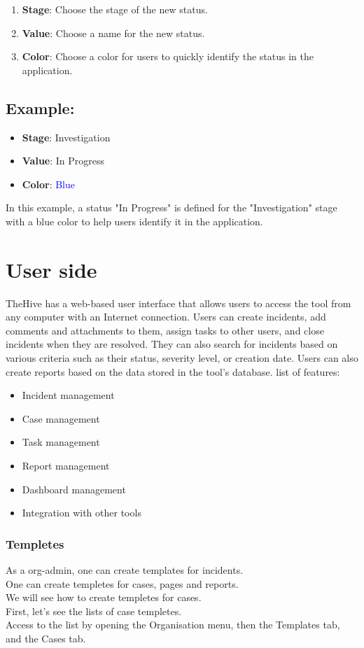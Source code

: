 \documentclass{article}
\begin{document}
\begin{enumerate}
  \item \textbf{Stage}: Choose the stage of the new status.
  \item \textbf{Value}: Choose a name for the new status.
  \item \textbf{Color}: Choose a color for users to quickly identify the status in the application.
\end{enumerate}

\subsection*{Example:}

\begin{itemize}
  \item \textbf{Stage}: Investigation
  \item \textbf{Value}: In Progress
  \item \textbf{Color}: \textcolor{blue}{Blue}
\end{itemize}

In this example, a status "In Progress" is defined for the "Investigation" stage with a blue color to help users identify it in the application.


\section{User side}
TheHive has a web-based user interface that allows users to access the tool from any computer with an Internet connection. Users can create incidents, add comments and attachments to them, assign tasks to other users, and close incidents when they are resolved. They can also search for incidents based on various criteria such as their status, severity level, or creation date. Users can also create reports based on the data stored in the tool's database.
list of features:
\begin{itemize}
\item Incident management
\item Case management
\item Task management
\item Report management
\item Dashboard management
\item Integration with other tools
\end{itemize}

\subsubsection{Templetes}
As a org-admin, one can create templates for incidents.\\
One can create templetes for cases, pages and reports.\\
We will see how to create templetes for cases.\\
First, let's see the lists of case templetes.\\
Access to the list by opening the Organisation menu, then the Templates tab, and the Cases tab.
\end{document}
